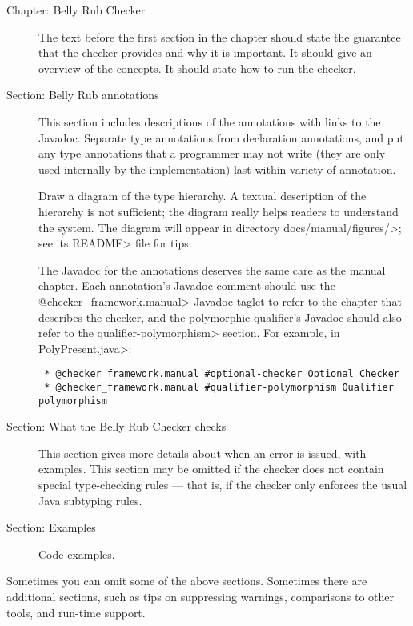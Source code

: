 \begin{description}

\item[Chapter: Belly Rub Checker]
  The text before the first section in the chapter should state the
  guarantee that the checker provides and why it is important.  It should
  give an overview of the concepts.  It should state how to run the checker.

\item[Section: Belly Rub annotations]
  This section includes descriptions of the annotations with links to the
  Javadoc.  Separate type annotations from declaration annotations, and put
  any type annotations that a programmer may not write (they are only used
  internally by the implementation) last within variety of annotation.

  Draw a diagram of the type hierarchy.  A textual description of
  the hierarchy is not sufficient; the diagram really helps readers to
  understand the system.
  The diagram will appear in directory \<docs/manual/figures/>;
  see its \<README> file for tips.

  The Javadoc for the annotations deserves the same care as the manual
  chapter.  Each annotation's Javadoc comment should use the
  \<@checker\_framework.manual> Javadoc taglet to refer to the chapter that
  describes the checker, and the polymorphic qualifier's Javadoc should
  also refer to the \<qualifier-polymorphism> section.  For example, in
  \<PolyPresent.java>:

  \begin{Verbatim}
 * @checker_framework.manual #optional-checker Optional Checker
 * @checker_framework.manual #qualifier-polymorphism Qualifier polymorphism
  \end{Verbatim}

\item[Section: What the Belly Rub Checker checks]
  This section gives more details about when an error is issued, with examples.
  This section may be omitted if the checker does not contain special
  type-checking rules --- that is, if the checker only enforces the usual
  Java subtyping rules.

\item[Section: Examples]
  Code examples.
\end{description}

Sometimes you can omit some of the above sections.  Sometimes there are
additional sections, such as tips on suppressing warnings, comparisons to
other tools, and run-time support.

